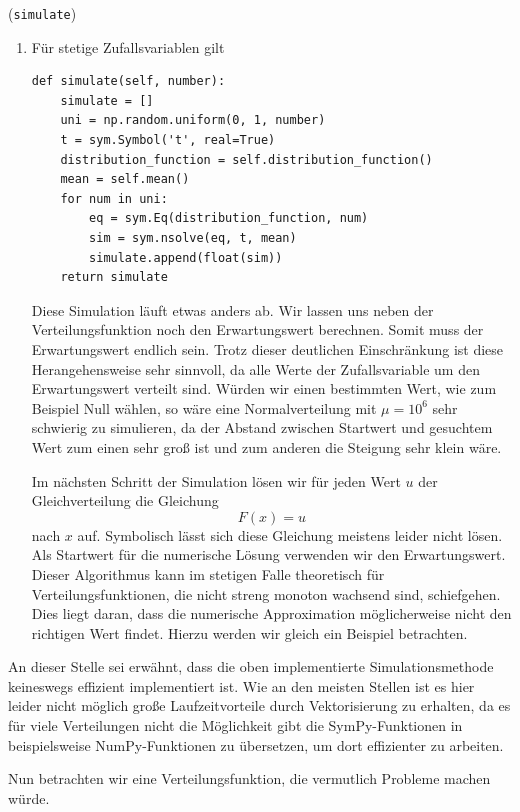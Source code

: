 \begin{Code}{(\lstinline|simulate|)}
\begin{enumerate}[label=(\roman*)]
\item Für stetige Zufallsvariablen gilt
\begin{lstlisting}
def simulate(self, number):
    simulate = []
    uni = np.random.uniform(0, 1, number)
    t = sym.Symbol('t', real=True)
    distribution_function = self.distribution_function()
    mean = self.mean()
    for num in uni:
        eq = sym.Eq(distribution_function, num)
        sim = sym.nsolve(eq, t, mean)
        simulate.append(float(sim))
    return simulate
\end{lstlisting}
Diese Simulation läuft etwas anders ab. Wir lassen uns neben der Verteilungsfunktion noch den Erwartungswert berechnen. Somit muss der Erwartungswert endlich sein. Trotz dieser deutlichen Einschränkung ist diese Herangehensweise sehr sinnvoll, da alle Werte der Zufallsvariable um den Erwartungswert verteilt sind. Würden wir einen bestimmten Wert, wie zum Beispiel Null wählen, so wäre eine Normalverteilung mit $\mu = 10^6$ sehr schwierig zu simulieren, da der Abstand zwischen Startwert und gesuchtem Wert zum einen sehr groß ist und zum anderen die Steigung sehr klein wäre.

\newpage

Im nächsten Schritt der Simulation lösen wir für jeden Wert $u$ der Gleichverteilung die Gleichung
\[F(x) = u\]
nach $x$ auf. Symbolisch lässt sich diese Gleichung meistens leider nicht lösen. Als Startwert für die numerische Lösung verwenden wir den Erwartungswert. Dieser Algorithmus kann im stetigen Falle theoretisch für Verteilungsfunktionen, die nicht streng monoton wachsend sind, schiefgehen. Dies liegt daran, dass die numerische Approximation möglicherweise nicht den richtigen Wert \glqq findet\grqq{}. Hierzu werden wir gleich ein Beispiel betrachten.
\end{enumerate}

An dieser Stelle sei erwähnt, dass die oben implementierte Simulationsmethode keineswegs effizient implementiert ist. Wie an den meisten Stellen ist es hier leider nicht möglich große Laufzeitvorteile durch Vektorisierung zu erhalten, da es für viele Verteilungen nicht die Möglichkeit gibt die SymPy-Funktionen in beispielsweise NumPy-Funktionen zu übersetzen, um dort effizienter zu arbeiten.
\end{Code}

Nun betrachten wir eine Verteilungsfunktion, die vermutlich Probleme machen würde.

